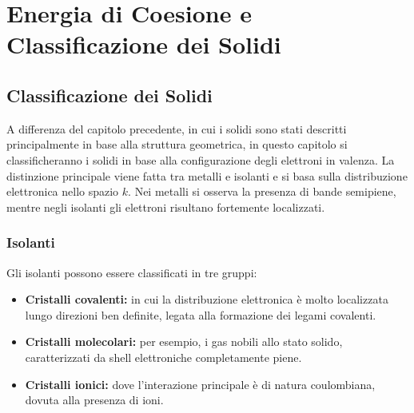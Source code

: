 
\chapter{Energia di Coesione e Classificazione dei Solidi}

\section{Classificazione dei Solidi}

A differenza del capitolo precedente, in cui i solidi sono stati descritti principalmente in base alla struttura geometrica, in questo capitolo si classificheranno i solidi in base alla configurazione degli elettroni in valenza.  
La distinzione principale viene fatta tra metalli e isolanti e si basa sulla distribuzione elettronica nello spazio $k$.  
Nei metalli si osserva la presenza di bande semipiene, mentre negli isolanti gli elettroni risultano fortemente localizzati.

\subsection{Isolanti}
Gli isolanti possono essere classificati in tre gruppi:
\begin{itemize}
    \item \textbf{Cristalli covalenti:} in cui la distribuzione elettronica è molto localizzata lungo direzioni ben definite, legata alla formazione dei legami covalenti.
    \item \textbf{Cristalli molecolari:} per esempio, i gas nobili allo stato solido, caratterizzati da shell elettroniche completamente piene.
    \item \textbf{Cristalli ionici:} dove l'interazione principale è di natura coulombiana, dovuta alla presenza di ioni.
\end{itemize}

